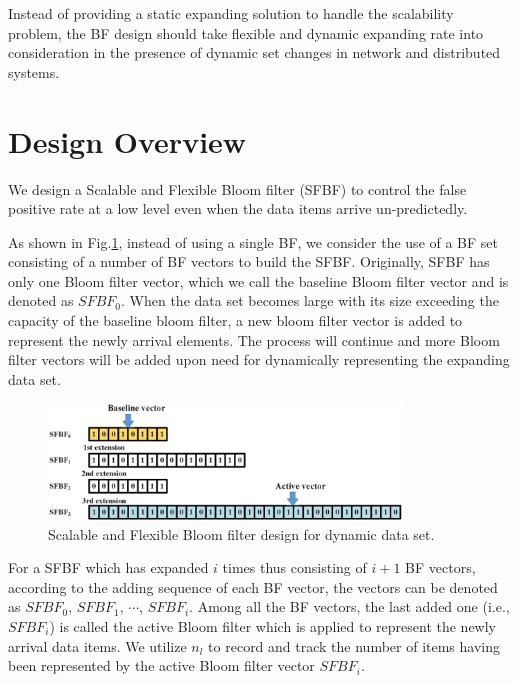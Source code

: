 \documentclass[10pt,journal,letterpaper]{IEEEtran}
\newcommand{\rev}[1]{#1}
\begin{document}
Instead of providing a static expanding solution to handle the scalability problem, the BF design should take flexible and dynamic expanding rate into consideration in the presence of  dynamic set changes in network and distributed systems.




\section{Design Overview}
\label{sec:Scalable and rate-dependent bloom filter}
We design a Scalable and Flexible Bloom filter (SFBF) to control the false positive rate at a low level even when the data items arrive un-predictedly.

As shown in Fig.\ref{fig:Scalable bloom filter design for dynamic MCC}, instead of using a single BF, we consider the use of a BF set consisting of a number of BF vectors to build the SFBF. Originally, SFBF has only one Bloom filter vector, which we call the baseline Bloom filter vector and is denoted as $SFBF_0$. When the data set becomes large with its size exceeding the capacity of the baseline bloom filter, a new bloom filter vector is added to represent the newly arrival elements. The process will continue and more Bloom filter vectors will be added  upon need  for dynamically representing the expanding data set.

\begin{figure}[!h]
\centering
\includegraphics[width=3.7in]{fig/sbf}
\caption{ Scalable and Flexible Bloom filter design for dynamic data set.}
\label{fig:Scalable bloom filter design for dynamic MCC}
\end{figure}
For a SFBF which has expanded $i$ times thus consisting of $i+1$ BF vectors, according to the adding sequence of each BF vector, the vectors can be denoted as $SFBF_0$, $SFBF_1$, $\cdots$, $SFBF_i$.
Among all the BF vectors,  the last added one (i.e.,$SFBF_i$) is called the active Bloom filter which is applied to represent the newly arrival data items. We  utilize $n_l$ to record and track the number of items having been represented by the active Bloom filter vector $SFBF_i$.%
\end{document}

